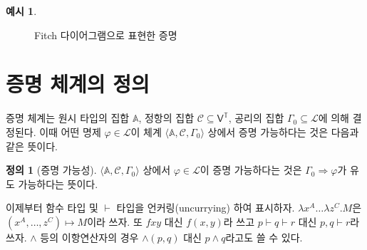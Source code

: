\documentclass[10pt,twocolumn]{article}
\theoremstyle{definition}
\newtheorem{definition}[theorem]{정의}
\newtheorem{example}[theorem]{예시}
\begin{document}
\begin{example}
	\begin{figure}[bt] \centering\small{}
		\caption{Fitch 다이어그램으로 표현한 증명} \label{fig:proof2}
	\end{figure}
\end{example}

\section{증명 체계의 정의}

증명 체계는 원시 타입의 집합 $\mathbb A$, 정항의 집합 $\mathcal C\subseteq\mathsf V^{\mathds T}$, 공리의 집합 $\Gamma_0\subseteq\mathcal L$에 의해 결정된다. 이때 어떤 명제 $\varphi\in\mathcal L$이 체계 $\langle\mathbb A,\mathcal C,\Gamma_0\rangle$ 상에서 증명 가능하다는 것은 다음과 같은 뜻이다.

\begin{definition}[증명 가능성]
	$\langle\mathbb A,\mathcal C,\Gamma_0\rangle$ 상에서 $\varphi\in\mathcal L$이 증명 가능하다는 것은 $\Gamma_0\Rightarrow\varphi$가 유도 가능하다는 뜻이다.
\end{definition}

이제부터 함수 타입 및 $\vdash$ 타입을 언커링(uncurrying) 하여 표시하자. $\lambda x^A\ldots\lambda z^C.M$은 $(x^A, \ldots, z^C)\mapsto M$이라 쓰자. 또 $fxy$ 대신 $f(x, y)$라 쓰고 $p\vdash q\vdash r$ 대신 $p, q\vdash r$라 쓰자. $\land$ 등의 이항연산자의 경우 ${\land}(p, q)$ 대신 $p\land q$라고도 쓸 수 있다.
\end{document}
